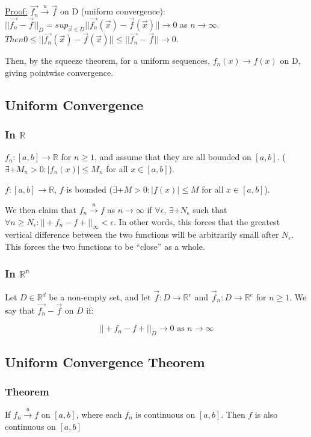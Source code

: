 \documentclass[11 pt, twoside]{article}
\begin{document}
\underline{Proof:}
$\vec{f_n} \overset{u}{\to} \vec{f}$ on D (uniform convergence): $||\vec{f_n} - \vec{f}||_D = sup_{\vec{x} \in D} ||\vec{f_n}(\vec{x}) - \vec{f}(\vec{x})|| \to 0$ as $n \to \infty.$ $Then 0 \leq ||\vec{f_n}(\vec{x}) - \vec{f}(\vec{x})|| \leq  ||\vec{f_n} - \vec{f}|| \to 0.$

Then, by the squeeze theorem, for a uniform sequences, $f_n(x) \to f(x)$ on D, giving pointwise convergence.

\subsection{Uniform Convergence}
\subsubsection{In $\mathbb{R}$}
$f_n : [a,b] \to \mathbb{R}$ for $n \geq 1$, and assume that they are all
bounded on $[a,b]$. ($\exists+ M_n > 0 : |f_n(x)| \leq M_n$ for all $x \in
[a,b]$).

$f:[a,b] \to \mathbb{R}$, $f$ is bounded ($\exists+ M > 0: |f(x)| \leq M$
for all $x \in [a,b]$).

We then claim that $f_n \overset{u}{\to} f$ as $n \to \infty$ if $\forall
\epsilon$, $\exists+ N_\epsilon$ such that $\forall n \geq
N_\epsilon : ||+f_n - f+||_\infty < \epsilon$. In other words, this
forces that the greatest vertical difference between the two functions will be
arbitrarily small after $N_\epsilon$. This forces the two functions to be
``close'' as a whole.

\subsubsection{In $\mathbb{R^n}$}

Let $D \in \mathbb{R}^d$ be a non-empty set, and let $\vec{f}:
D\to\mathbb{R}^e$ and $\vec{f}_n: D \to \mathbb{R}^e$ for $n \geq 1$. We
say that $\vec{f_n} - \vec{f}$ on $D$ if:

$$||+f_n - f+||_D \to 0 \text{ as } n \to \infty$$

\subsection{Uniform Convergence Theorem}
\subsubsection{Theorem}
If $f_n \overset{u}{\to} f$ on $[a, b]$, where each $f_n$ is continuous on
$[a,b]$. Then $f$ is also continuous on $[a,b]$
\end{document}
